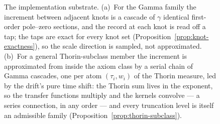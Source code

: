 \begin{figure}[t]
\begin{tikzpicture}[every node/.style={font=\small}, line cap=round, >=stealth,
  sect/.style={draw, minimum width=1.05cm, minimum height=0.62cm, inner sep=1pt},
  tap/.style={fill, circle, inner sep=1.2pt}]
\end{tikzpicture}
\caption{The implementation substrate. (a)~For the Gamma family the increment between
adjacent knots is a cascade of $\gamma$ identical first-order pole--zero sections, and the
record at each knot is read off a tap; the taps are exact for every knot set
(Proposition~\ref{prop:knot-exactness}), so the scale direction is sampled, not
approximated. (b)~For a general Thorin-subclass member the increment is approximated from
inside the axiom class by a serial chain of Gamma cascades, one per atom $(\tau_i, w_i)$ of
the Thorin measure, led by the drift's pure time shift: the Thorin sum lives in the
exponent, so the transfer functions multiply and the kernels convolve --- a series
connection, in any order --- and every truncation level is itself an admissible family
(Proposition~\ref{prop:thorin-subclass}).}
\label{fig:filterbank}
\end{figure}
